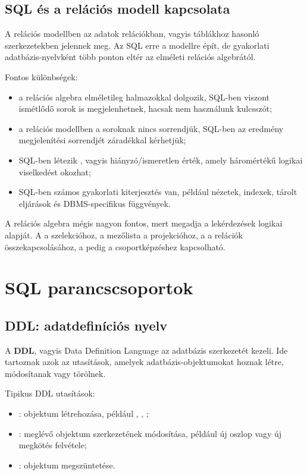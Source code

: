 \subsection{SQL és a relációs modell kapcsolata}

A relációs modellben az adatok relációkban, vagyis táblákhoz hasonló szerkezetekben jelennek meg. Az SQL erre a modellre épít, de gyakorlati adatbázis-nyelvként több ponton eltér az elméleti relációs algebrától.

Fontos különbségek:

\begin{itemize}
  \item a relációs algebra elméletileg halmazokkal dolgozik, SQL-ben viszont ismétlődő sorok is megjelenhetnek, hacsak nem használunk  kulcsszót;
  \item a relációs modellben a soroknak nincs sorrendjük, SQL-ben az eredmény megjelenítési sorrendjét  záradékkal kérhetjük;
  \item SQL-ben létezik , vagyis hiányzó/ismeretlen érték, amely háromértékű logikai viselkedést okozhat;
  \item SQL-ben számos gyakorlati kiterjesztés van, például nézetek, indexek, tárolt eljárások és DBMS-specifikus függvények.
\end{itemize}

A relációs algebra mégis nagyon fontos, mert megadja a lekérdezések logikai alapját. A  a szelekcióhoz, a  mezőlista a projekcióhoz, a  a relációk összekapcsolásához, a  pedig a csoportképzéshez kapcsolható.

\section{SQL parancscsoportok}

\subsection{DDL: adatdefiníciós nyelv}

A \textbf{DDL}, vagyis Data Definition Language az adatbázis szerkezetét kezeli. Ide tartoznak azok az utasítások, amelyek adatbázis-objektumokat hoznak létre, módosítanak vagy törölnek.

Tipikus DDL utasítások:

\begin{itemize}
  \item {}: objektum létrehozása, például , , ;
  \item {}: meglévő objektum szerkezetének módosítása, például új oszlop vagy új megkötés felvétele;
  \item {}: objektum megszüntetése.
\end{itemize}

